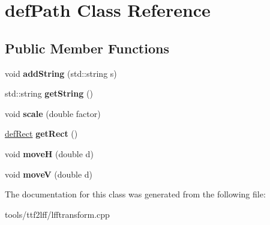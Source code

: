 \hypertarget{classdefPath}{\section{def\-Path Class Reference}
\label{classdefPath}
}
\subsection*{Public Member Functions}
\begin{DoxyCompactItemize}
\item 
\hypertarget{classdefPath_a23b96239feaec67438a66687cc1f16d0}{void {\bfseries add\-String} (std\-::string s)}\label{classdefPath_a23b96239feaec67438a66687cc1f16d0}

\item 
\hypertarget{classdefPath_a31232d164bcd962c6a3957c7f5c22074}{std\-::string {\bfseries get\-String} ()}\label{classdefPath_a31232d164bcd962c6a3957c7f5c22074}

\item 
\hypertarget{classdefPath_a8fa71075974f15269bdca98727d73f03}{void {\bfseries scale} (double factor)}\label{classdefPath_a8fa71075974f15269bdca98727d73f03}

\item 
\hypertarget{classdefPath_a03d03b9731d4e554da94e6cae7f1c98b}{\hyperlink{classdefRect}{def\-Rect} {\bfseries get\-Rect} ()}\label{classdefPath_a03d03b9731d4e554da94e6cae7f1c98b}

\item 
\hypertarget{classdefPath_a71d11ad842abbd15ed324fc0a105731d}{void {\bfseries move\-H} (double d)}\label{classdefPath_a71d11ad842abbd15ed324fc0a105731d}

\item 
\hypertarget{classdefPath_a48ab751c5c89e73653d985071e3ec95a}{void {\bfseries move\-V} (double d)}\label{classdefPath_a48ab751c5c89e73653d985071e3ec95a}

\end{DoxyCompactItemize}


The documentation for this class was generated from the following file\-:\begin{DoxyCompactItemize}
\item 
tools/ttf2lff/lfftransform.\-cpp\end{DoxyCompactItemize}
